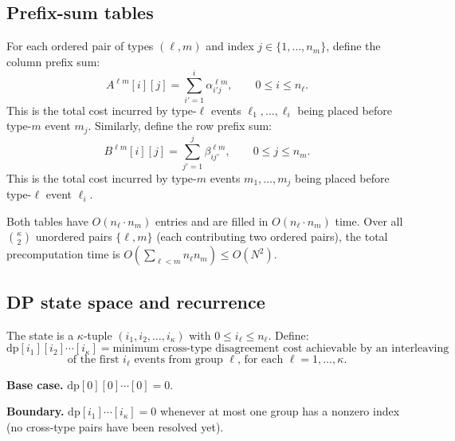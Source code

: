 \documentclass[11pt]{article}
\begin{document}
\subsection{Prefix-sum tables}

For each ordered pair of types $(\ell, m)$ and index $j \in \{1,\ldots, n_m\}$,
define the column prefix sum:
\[
  A^{\ell m}[i][j] = \sum_{i'=1}^{i} \alpha_{i'j}^{\ell m},
  \qquad 0 \le i \le n_\ell.
\]
This is the total cost incurred by type-$\ell$ events $\ell_1, \ldots, \ell_i$ being
placed before type-$m$ event $m_j$.  Similarly, define the row prefix sum:
\[
  B^{\ell m}[i][j] = \sum_{j'=1}^{j} \beta_{ij'}^{\ell m},
  \qquad 0 \le j \le n_m.
\]
This is the total cost incurred by type-$m$ events $m_1, \ldots, m_j$ being placed
before type-$\ell$ event $\ell_i$.

Both tables have $O(n_\ell \cdot n_m)$ entries and are filled in $O(n_\ell \cdot n_m)$
time.  Over all $\binom{\kappa}{2}$ unordered pairs $\{\ell, m\}$ (each contributing
two ordered pairs), the total precomputation time is $O\!\left(\sum_{\ell < m} n_\ell
n_m\right) \le O(N^2)$.

\subsection{DP state space and recurrence}

The state is a $\kappa$-tuple $(i_1, i_2, \ldots, i_\kappa)$ with $0 \le i_\ell \le
n_\ell$.  Define:
\[
  \mathrm{dp}[i_1][i_2]\cdots[i_\kappa]
  = \text{minimum cross-type disagreement cost achievable by an interleaving}
\]
\[
  \text{of the first $i_\ell$ events from group $\ell$, for each $\ell = 1, \ldots, \kappa$.}
\]

\smallskip
\noindent\textbf{Base case.} $\mathrm{dp}[0][0]\cdots[0] = 0$.

\smallskip
\noindent\textbf{Boundary.} $\mathrm{dp}[i_1]\cdots[i_\kappa] = 0$ whenever at most
one group has a nonzero index (no cross-type pairs have been resolved yet).
\end{document}
